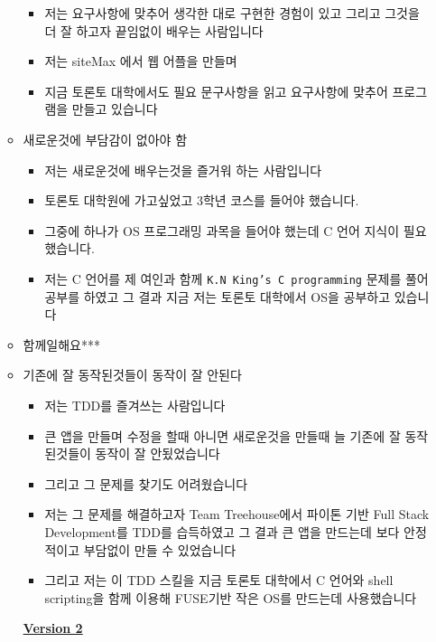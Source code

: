 \documentclass[12pt]{article}
\begin{document}
\begin{itemize}
\begin{itemize}
        \bigskip

        \begin{itemize}
            \item 저는 요구사항에 맞추어 생각한 대로 구현한 경험이 있고 그리고 그것을 더 잘 하고자 끝임없이 배우는 사람입니다
            \item 저는 siteMax 에서 웹 어플을 만들며
            \item 지금 토론토 대학에서도 필요 문구사항을 읽고 요구사항에 맞추어 프로그램을 만들고 있습니다
        \end{itemize}
        \item 새로운것에 부담감이 없아야 함
        \begin{itemize}
            \item 저는 새로운것에 배우는것을 즐거워 하는 사람입니다
            \item 토론토 대학원에 가고싶었고 3학년 코스를 들어야 했습니다.
            \item 그중에 하나가 OS 프로그래밍 과목을 들어야 했는데 C 언어 지식이 필요했습니다.
            \item 저는 C 언어를 제 여인과 함께 \texttt{K.N King's C programming} 문제를 풀어 공부를 하였고 그 결과 지금 저는 토론토 대학에서 OS을 공부하고 있습니다
        \end{itemize}
        \item 함께일해요***
        \item 기존에 잘 동작된것들이 동작이 잘 안된다

        \begin{itemize}
            \item 저는 TDD를 즐겨쓰는 사람입니다
            \item 큰 앱을 만들며 수정을 할때 아니면 새로운것을 만들때 늘 기존에 잘 동작된것들이 동작이 잘 안됬었습니다
            \item 그리고 그 문제를 찾기도 어려웠습니다
            \item 저는 그 문제를 해결하고자 Team Treehouse에서 파이톤 기반 Full Stack Development를 TDD를 습득하였고 그 결과
            큰 앱을 만드는데 보다 안정적이고 부담없이 만들 수 있었습니다
            \item 그리고 저는 이 TDD 스킬을 지금 토론토 대학에서 C 언어와 shell scripting을 함께 이용해 FUSE기반 작은 OS를 만드는데 사용했습니다
        \end{itemize}

        \bigskip

        \underline{\textbf{Version 2}}


\end{itemize}
\end{itemize}
\end{document}
